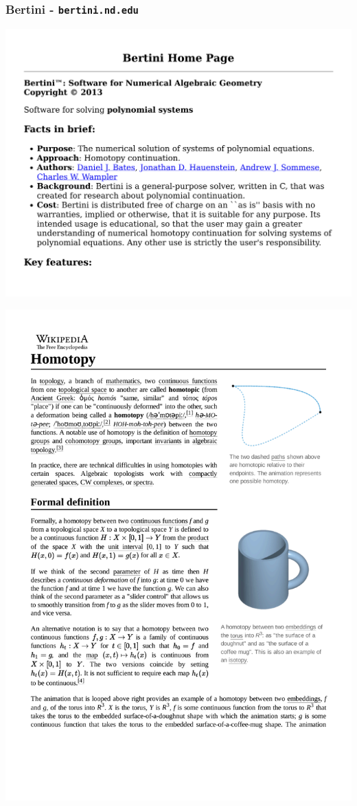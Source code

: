 \documentclass{beamer}
\begin{document}
\begin{frame}[fragile]
\frametitle{Bertini - {\tt bertini.nd.edu}}
\includegraphics[page=1, clip, trim=0in 1.5in 0in 0in, width=\textwidth]{bertini.nd.edu.pdf}
\end{frame}

\begin{frame}
\includegraphics[width=\textwidth]{Homotopy.pdf}
\end{frame}
\end{document}
